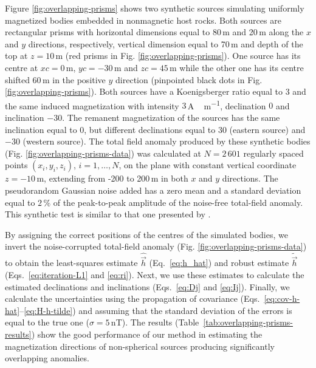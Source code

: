 \documentclass[journal abbreviation, npg]{copernicus}
\begin{document}
Figure \ref{fig:overlapping-prisms} shows two synthetic sources
simulating uniformly magnetized bodies embedded in nonmagnetic 
host rocks. Both sources are rectangular prisms with 
horizontal dimensions equal to 80\,\unit{m} and 20\,\unit{m} along
the $x$ and $y$ directions, respectively, vertical dimension
equal to 70\,\unit{m} and depth of the top at $z = 10$\,\unit{m}
(red prisms in Fig. \ref{fig:overlapping-prisms}).
One source has its centre at $xc = 0$\,\unit{m}, $yc = -30$\,\unit{m}
and $zc = 45$\,\unit{m} while the other one has its centre shifted
60\,\unit{m} in the positive $y$ direction (pinpointed black dots
in Fig. \ref{fig:overlapping-prisms}). Both sources
have a Koenigsberger ratio equal to $3$ and the same induced 
magnetization with intensity $3$\,\unit{A\,m^{-1}}, declination 
$0${\degree} and inclination $-30${\degree}. The remanent 
magnetization of the sources has the same inclination equal to 
$0${\degree}, but different declinations equal to $30${\degree}
(eastern source) and $-30${\degree} (western source). The total field
anomaly produced by these synthetic bodies (Fig. 
\ref{fig:overlapping-prisms-data}) was calculated at $N = 2\,601$
regularly spaced points $(x_{i}, y_{i}, z_{i})$, $i = 1, \ldots, N$, on 
the plane with constant vertical coordinate $z=-10$\,\unit{m}, extending 
from -200 to 200\,\unit{m} in both $x$ and $y$ directions. The 
pseudorandom Gaussian noise added has a zero mean and a standard deviation 
equal to $2\,\%$ of the peak-to-peak amplitude of the noise-free total-field
anomaly. This synthetic test is similar to that one presented by
\citet{lelievre-oldenburg2009}.

By assigning the correct positions of the centres of the simulated bodies, we
invert the noise-corrupted total-field anomaly (Fig. 
\ref{fig:overlapping-prisms-data}) to obtain the least-squares estimate 
$\hat{\vec{h}}$ (Eq.~\ref{eq:h_hat}) and
robust estimate $\tilde{\vec{h}}$ (Eqs.~\ref{eq:iteration-L1} and
\ref{eq:ri}). Next, we use these estimates to calculate the estimated
declinations and inclinations (Eqs.~\ref{eq:Dj} and \ref{eq:Ij}). Finally, we
calculate the uncertainties using the propagation of covariance
(Eqs.~\ref{eq:cov-h-hat}--\ref{eq:H-h-tilde}) and assuming that the standard
deviation of the errors is equal to the true one ($\sigma = 5$\,nT). The
results (Table~\ref{tab:overlapping-prisms-results}) show the good
performance of our method in estimating the magnetization directions of
non-spherical sources producing significantly overlapping anomalies. 
\end{document}
